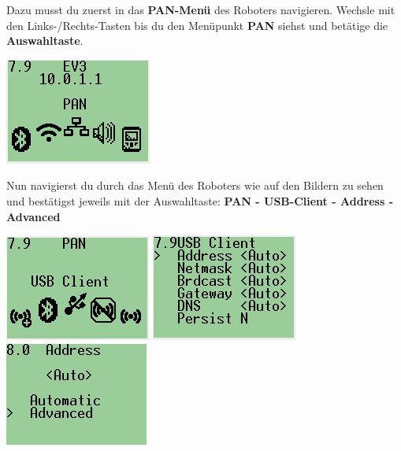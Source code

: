 \documentclass[
	12pt,
	article,
	type=bsc, %
	colorbacktitle,
	instlogo,
	accentcolor=tud1c,
	german,
	twoside
]{tudexercise}
\begin{document}
		\begin{enumerate}	
		\begin{minipage}{.5\textwidth}
		\item Dazu musst du zuerst in das \textbf{PAN-Menü} des Roboters navigieren. Wechsle mit den Links-/Rechts-Tasten bis du den Menüpunkt \textbf{PAN} siehst und betätige die \textbf{Auswahltaste}.
		\end{minipage}
		\begin{minipage}{.5\textwidth}
		\includegraphics[width=.8\textwidth]{img/ev3_pan.png}
		\end{minipage}
		
		\item Nun navigierst du durch das Menü des Roboters wie auf den Bildern zu sehen und bestätigst jeweils mit der Auswahltaste: \textbf{PAN - USB-Client - Address - Advanced}
		
		\includegraphics[width=.3\textwidth]{img/ev3_pan_usb.png}
		\includegraphics[width=.3\textwidth]{img/ev3_pan_usb_address.png}		
		\includegraphics[width=.3\textwidth]{img/ev3_pan_usb_advanced.png}
		

\end{enumerate}
\end{document}

